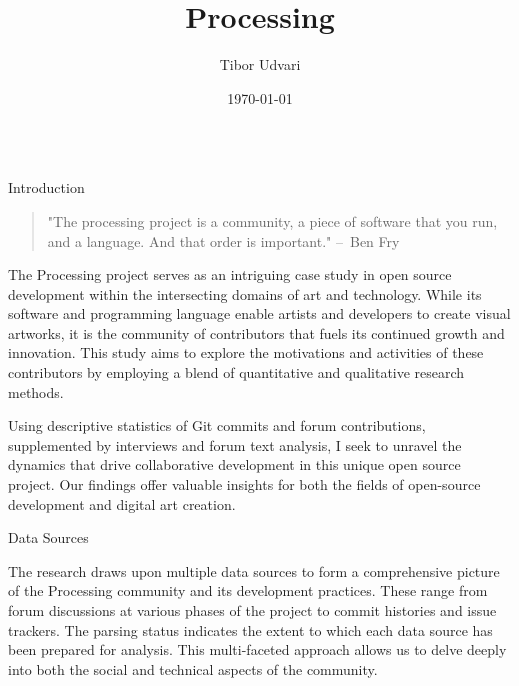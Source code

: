 \documentclass[final]{beamer}
\title{Processing}
\author{Tibor Udvari}
\institute{HEAD – Genève}
\date{\today}
\begin{document}
\begin{frame}[t]
  \begin{columns}[t]
    \begin{column}{.32\textwidth}
      \begin{block}{Introduction}
        \vspace{0.5em}
        \begin{quote}
          "The processing project is a community, a piece of software that you run, and a language. And that order is important." – Ben Fry \parencite[19:22]{artsatmit2017CASTSymposium2017}
          \end{quote}
          The Processing project serves as an intriguing case study in open source development within the intersecting domains of art and technology. While its software and programming language enable artists and developers to create visual artworks, it is the community of contributors that fuels its continued growth and innovation. This study aims to explore the motivations and activities of these contributors by employing a blend of quantitative and qualitative research methods. 
          \smallskip  %

          Using descriptive statistics of Git commits and forum contributions, supplemented by interviews and forum text analysis, I seek to unravel the dynamics that drive collaborative development in this unique open source project. Our findings offer valuable insights for both the fields of open-source development and digital art creation.
      \end{block}
      \begin{block}{Data Sources}
                
      \end{block}
      \smallskip  %
  
      The research draws upon multiple data sources to form a comprehensive picture of the Processing community and its development practices. These range from forum discussions at various phases of the project to commit histories and issue trackers. The parsing status indicates the extent to which each data source has been prepared for analysis. This multi-faceted approach allows us to delve deeply into both the social and technical aspects of the community.
    

\end{column}
\end{columns}
\end{frame}
\end{document}
